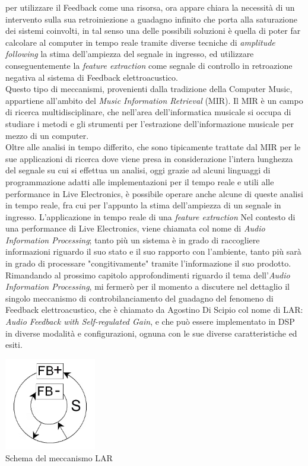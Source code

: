 per utilizzare il Feedback come una risorsa,
ora appare chiara la necessità di un intervento sulla sua retroiniezione a guadagno infinito 
che porta alla saturazione dei sistemi coinvolti, 
in tal senso una delle possibili soluzioni è quella di poter far calcolare
al computer in tempo reale tramite diverse tecniche di \textit{amplitude following} la stima dell'ampiezza
del segnale in ingresso, ed utilizzare conseguentemente la \textit{feature extraction} 
come segnale di controllo in retroazione negativa al sistema di Feedback elettroacustico. \\
Questo tipo di meccanismi, provenienti dalla tradizione della Computer Music, appartiene 
all'ambito del \textit{Music Information Retrieval} (MIR).
Il MIR è un campo di ricerca multidisciplinare, che nell'area dell’informatica musicale si occupa di
studiare i metodi e gli strumenti per l’estrazione dell’informazione musicale per mezzo di un
computer. \\
Oltre alle analisi in tempo differito, che sono tipicamente trattate dal MIR
per le sue applicazioni di ricerca dove viene presa in considerazione
l’intera lunghezza del segnale su cui si effettua un analisi, 
oggi grazie ad alcuni linguaggi di programmazione
adatti alle implementazioni per il tempo reale e utili alle
performance in Live Electronics, è possibile operare anche alcune
di queste analisi in tempo reale, fra cui per l'appunto la stima dell'ampiezza
di un segnale in ingresso.
L'applicazione in tempo reale di una \textit{feature extraction} 
Nel contesto di una performance di Live Electronics, viene chiamata col nome di
\textit{Audio Information Processing};
tanto più un sistema è in grado di raccogliere informazioni riguardo
il suo stato e il suo rapporto con l'ambiente, tanto più sarà in grado di
processare "congitivamente" tramite l'informazione il suo prodotto. \\
Rimandando al prossimo capitolo approfondimenti riguardo il tema 
dell'\textit{Audio Information Processing}, mi fermerò per il momento a discutere 
nel dettaglio il singolo meccanismo di controbilanciamento del guadagno
del fenomeno di Feedback elettroacustico, che è chiamato da Agostino Di Scipio col nome di 
LAR: \textit{Audio Feedback with Self-regulated Gain},
e che può essere implementato in DSP in diverse modalità e configurazioni,
ognuna con le sue diverse caratteristiche ed esiti. \\

\begin{center}
\vspace{0.25cm}
\includegraphics[width=4cm]{figures/controlled_larsen_Feedback.png} \\
{Schema del meccanismo LAR} \\ 
\vspace{0.5cm}
\end{center}

